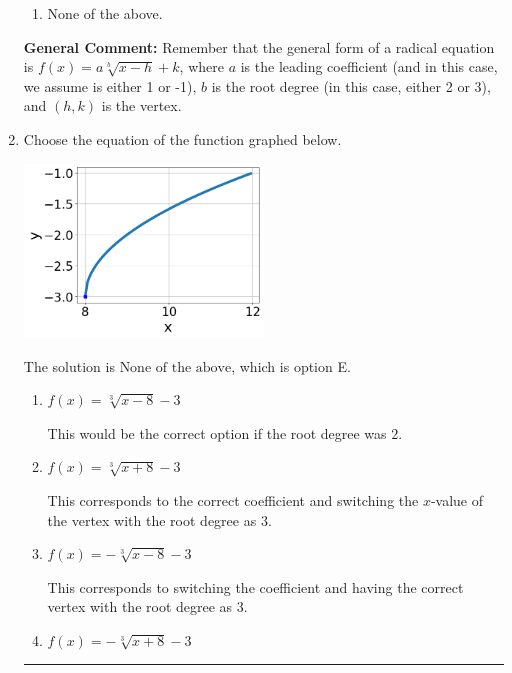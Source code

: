 \documentclass{extbook}[14pt]
\newcommand{\litem}[1]{\item #1

\rule{\textwidth}{0.4pt}}
\begin{document}
\begin{enumerate}
{\begin{enumerate}[label=\Alph*.]
\item None of the above.\end{enumerate}
\textbf{General Comment:} Remember that the general form of a radical equation is $ f(x) = a \sqrt[b]{x - h} + k $, where $a$ is the leading coefficient (and in this case, we assume is either 1 or -1), $b$ is the root degree (in this case, either 2 or 3), and $(h, k)$ is the vertex.
}
\litem{
Choose the equation of the function graphed below.

\begin{center}
    \includegraphics[width=0.5\textwidth]{../Figures/radicalGraphToEquationA.png}
\end{center}




The solution is \( \text{None of the above} \), which is option E.\begin{enumerate}[label=\Alph*.]
\item \( f(x) = \sqrt[3]{x - 8} - 3 \)

This would be the correct option if the root degree was $2$.
\item \( f(x) = \sqrt[3]{x + 8} - 3 \)

This corresponds to the correct coefficient and switching the $x$-value of the vertex with the root degree as $3$.
\item \( f(x) = - \sqrt[3]{x - 8} - 3 \)

This corresponds to switching the coefficient and having the correct vertex with the root degree as $3$.
\item \( f(x) = - \sqrt[3]{x + 8} - 3 \)


\end{enumerate}}
\end{enumerate}
\end{document}
